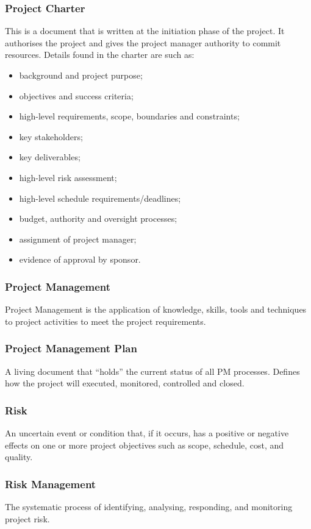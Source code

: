\documentclass[journal]{IEEEtran}
\begin{document}
\subsubsection{Project Charter}
This is a document that is written at the initiation phase of the project. It authorises the project and gives the project manager authority to commit resources. Details found in the charter are such as:
\begin{itemize}
	\item background and project purpose;
	\item objectives and success criteria;
	\item high-level requirements, scope, boundaries and constraints;
	\item key stakeholders;
	\item key deliverables;
	\item high-level risk assessment;
	\item high-level schedule requirements/deadlines;
	\item budget, authority and oversight processes;
	\item assignment of project manager;
	\item evidence of approval by sponsor.	
\end{itemize}
\subsubsection{Project Management}
Project Management is the application of knowledge, skills, tools and techniques to project activities to meet the project requirements.
\subsubsection{Project Management Plan}
A living document that “holds” the current status of all PM processes. Defines how the project will executed, monitored, controlled and closed.
\subsubsection{Risk}
An uncertain event or condition that, if it occurs, has a positive or negative effects on one or more project objectives such as scope, schedule, cost, and quality.
\subsubsection{Risk Management}
The systematic process of identifying, analysing, responding, and monitoring
project risk.
\end{document}

